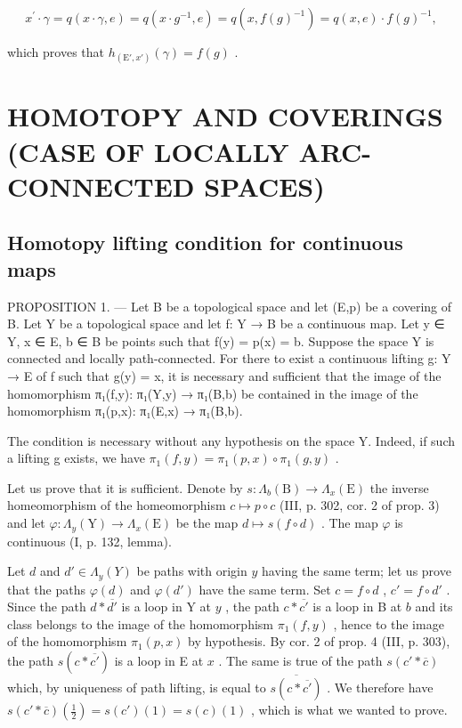 \[
x ^ {\prime} \cdot \gamma = q (x \cdot \gamma , e) = q (x \cdot g ^ {- 1}, e) = q (x, f (g) ^ {- 1}) = q (x, e) \cdot f (g) ^ {- 1},
\]

which proves that \(h_{(\mathrm{E}', x')}(\gamma) = f(g)\) .

\section{HOMOTOPY AND COVERINGS (CASE OF LOCALLY ARC-CONNECTED SPACES)}

\subsection{Homotopy lifting condition for continuous maps}

PROPOSITION 1. --- Let B be a topological space and let (E,p) be a covering of B. Let Y be a topological space and let f: Y → B be a continuous map. Let y ∈ Y, x ∈ E, b ∈ B be points such that f(y) = p(x) = b. Suppose the space Y is connected and locally path-connected. For there to exist a continuous lifting g: Y → E of f such that g(y) = x, it is necessary and sufficient that the image of the homomorphism π₁(f,y): π₁(Y,y) → π₁(B,b) be contained in the image of the homomorphism π₁(p,x): π₁(E,x) → π₁(B,b).

The condition is necessary without any hypothesis on the space Y. Indeed, if such a lifting g exists, we have \(\pi_{1}(f,y)=\pi_{1}(p,x)\circ\pi_{1}(g,y)\) .

Let us prove that it is sufficient. Denote by \(s\colon \Lambda_{b}(\mathrm{B})\to \Lambda_{x}(\mathrm{E})\) the inverse homeomorphism of the homeomorphism \(c\mapsto p\circ c\) (III, p. 302, cor. 2 of prop. 3) and let \(\varphi \colon \Lambda_y(\mathrm{Y})\to \Lambda_x(\mathrm{E})\) be the map \(d\mapsto s(f\circ d)\) . The map \(\varphi\) is continuous (I, p. 132, lemma).

Let \(d\) and \(d' \in \Lambda_y(Y)\) be paths with origin \(y\) having the same term; let us prove that the paths \(\varphi(d)\) and \(\varphi(d')\) have the same term. Set \(c = f \circ d\) , \(c' = f \circ d'\) . Since the path \(d * \overline{d'}\) is a loop in Y at \(y\) , the path \(c * \overline{c'}\) is a loop in B at \(b\) and its class belongs to the image of the homomorphism \(\pi_1(f, y)\) , hence to the image of the homomorphism \(\pi_1(p, x)\) by hypothesis. By cor. 2 of prop. 4 (III, p. 303), the path \(s(c * \overline{c'})\) is a loop in E at \(x\) . The same is true of the path \(s(c' * \overline{c})\) which, by uniqueness of path lifting, is equal to \(\overline{s(c * \overline{c'})}\) . We therefore have \(s(c' * \overline{c})(\frac{1}{2}) = s(c')(1) = s(c)(1)\) , which is what we wanted to prove.

